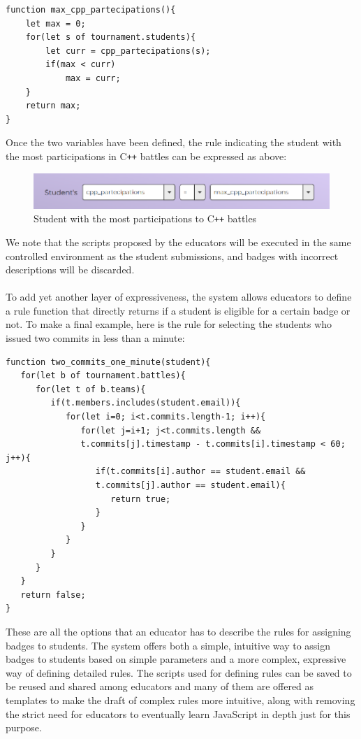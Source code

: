 \begin{verbatim}
function max_cpp_partecipations(){
    let max = 0;
    for(let s of tournament.students){
        let curr = cpp_partecipations(s);
        if(max < curr)
            max = curr;
    }
    return max;
}
\end{verbatim}
Once the two variables have been defined, the rule indicating the student with the most participations in C\texttt{++} battles can be expressed as above:

\begin{figure}[H]
    \centering
    \includegraphics[width=0.9\linewidth]{Images/UI_Badge_form3.png}
    \caption{Student with the most participations to C\texttt{++} battles}
    \label{fig:UI_form3}
\end{figure}
We note that the scripts proposed by the educators will be executed in the same controlled environment as the student submissions, and badges with incorrect descriptions will be discarded.\\
\\
To add yet another layer of expressiveness, the system allows educators to define a rule function that directly returns if a student is eligible for a certain badge or not. To make a final example, here is the rule for selecting the students who issued two commits in less than a minute:

\begin{verbatim}
function two_commits_one_minute(student){
   for(let b of tournament.battles){
      for(let t of b.teams){
         if(t.members.includes(student.email)){
            for(let i=0; i<t.commits.length-1; i++){
               for(let j=i+1; j<t.commits.length &&
               t.commits[j].timestamp - t.commits[i].timestamp < 60; j++){
                  if(t.commits[i].author == student.email &&
                  t.commits[j].author == student.email){
                     return true;
                  }
               }
            }
         }
      }
   }
   return false;
}
\end{verbatim}
These are all the options that an educator has to describe the rules for assigning badges to students. The system offers both a simple, intuitive way to assign badges to students based on simple parameters and a more complex, expressive way of defining detailed rules. The scripts used for defining rules can be saved to be reused and shared among educators and many of them are offered as templates to make the draft of complex rules more intuitive, along with removing the strict need for educators to eventually learn JavaScript in depth just for this purpose.